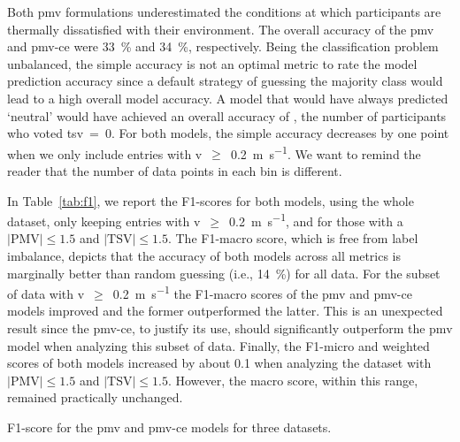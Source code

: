 Both \ac{pmv} formulations underestimated the conditions at which participants are thermally dissatisfied with their environment.
The overall accuracy of the \ac{pmv} and \ac{pmv-ce} were \qty{33}{\percent} and \qty{34}{\percent}, respectively.
Being the classification problem unbalanced, the simple accuracy is not an optimal metric to rate the model prediction accuracy since a default strategy of guessing the majority class would lead to a high overall model accuracy.
A model that would have always predicted `neutral' would have achieved an overall accuracy of , the number of participants who voted \ac{tsv}~=~0.
For both models, the simple accuracy decreases by one point when we only include entries with \ac{v}~$\geq$~\qty{0.2}{\m\per\s}.
We want to remind the reader that the number of data points in each bin is different.

In Table~\ref{tab:f1}, we report the F1-scores for both models, using the whole dataset, only keeping entries with \ac{v}~$\geq$~\qty{0.2}{\m\per\s}, and for those with a $\lvert \textrm{PMV}\lvert \leq 1.5$ and $\lvert \textrm{TSV}\lvert \leq 1.5$.
The F1-macro score, which is free from label imbalance, depicts that the accuracy of both models across all metrics is marginally better than random guessing (i.e., \qty{14}{\percent}) for all data.
For the subset of data with \ac{v}~$\geq$~\qty{0.2}{\m\per\s} the F1-macro scores of the \ac{pmv} and \ac{pmv-ce} models improved and the former outperformed the latter.
This is an unexpected result since the \ac{pmv-ce}, to justify its use, should significantly outperform the \ac{pmv} model when analyzing this subset of data.
Finally, the F1-micro and weighted scores of both models increased by about 0.1 when analyzing the dataset with $\lvert \textrm{PMV}\lvert \leq 1.5$ and $\lvert \textrm{TSV}\lvert \leq 1.5$.
However, the macro score, within this range, remained practically unchanged.
\begin{table}[htb!]
    \centering
    
    \caption{F1-score for the \ac{pmv} and \ac{pmv-ce} models for three datasets.}
    \label{tab:f1}
\end{table}


